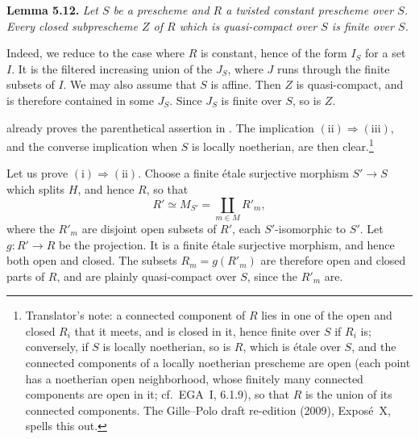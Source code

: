 \par\medskip\noindent
\textbf{Lemma 5.12.}\enspace
\emph{Let \(S\) be a prescheme and \(R\) a twisted constant prescheme over
\(S\). Every closed subprescheme \(Z\) of \(R\) which is quasi-compact
over \(S\) is finite over \(S\).}

Indeed, we reduce to the case where \(R\) is constant, hence of the form
\(I_S\) for a set \(I\). It is the filtered increasing union of the
\(J_S\), where \(J\) runs through the finite subsets of \(I\). We may also
assume that \(S\) is affine. Then \(Z\) is quasi-compact, and is therefore
contained in some \(J_S\). Since \(J_S\) is finite over \(S\), so is \(Z\).

 already proves the parenthetical assertion in
. The implication
\(\mathrm{(ii)}\Rightarrow\mathrm{(iii)}\), and the converse implication when
\(S\) is locally noetherian, are then clear.\footnote{Translator's note: a
connected component of \(R\) lies in one of the open and closed \(R_i\) that
it meets, and is closed in it, hence finite over \(S\) if \(R_i\) is;
conversely, if \(S\) is locally noetherian, so is \(R\), which is étale over
\(S\), and the connected components of a locally noetherian prescheme are
open (each point has a noetherian open neighborhood, whose finitely many
connected components are open in it; cf.\ EGA~I, 6.1.9), so that \(R\) is
the union of its connected components. The Gille--Polo draft re-edition
(2009), Expos\'e~X, spells this out.}

Let us prove \(\mathrm{(i)}\Rightarrow\mathrm{(ii)}\). Choose a finite
étale surjective morphism \(S'\to S\) which splits \(H\), and hence \(R\), so
that
\[
  R'\simeq M_{S'}=\coprod_{m\in M}R'_m,
\]
where the \(R'_m\) are disjoint open subsets of \(R'\), each
\(S'\)-isomorphic to \(S'\). Let \(g:R'\to R\) be the projection. It is a
finite étale surjective morphism, and hence both open and closed. The
subsets \(R_m=g(R'_m)\) are therefore open and closed parts of \(R\), and
are plainly quasi-compact over \(S\), since the \(R'_m\) are.


